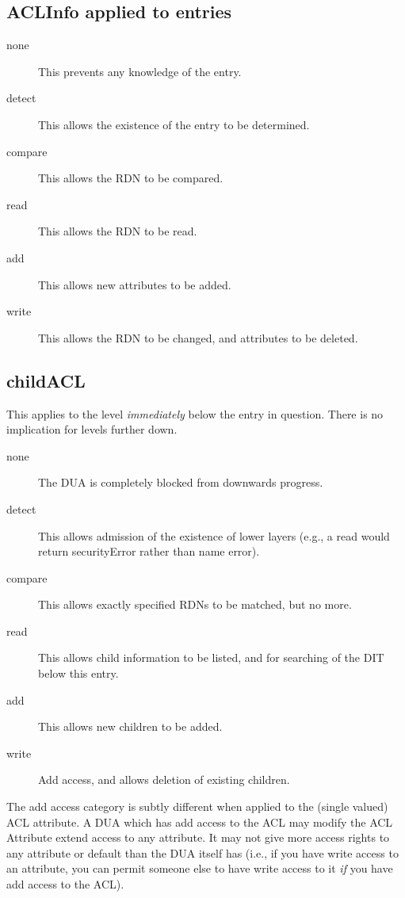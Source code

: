 \subsection {ACLInfo applied to entries}

\begin {description}
\item [none]

This prevents any knowledge of the entry.
\item [detect]

This allows the existence of the entry to be determined.
\item [compare]
This allows the RDN to be compared.
\item [read]
This allows the RDN to be read.
\item [add]
This allows new attributes to be added.
\item [write]
This allows the RDN to be changed, and attributes to be
deleted.
\end {description}

\subsection {childACL}

This applies to the level 
{\em immediately}
below the entry in question.
There is no implication for levels further down.

\begin {description}
\item [none]
The DUA is completely blocked from downwards progress.
\item [detect]

This allows admission of the existence of lower layers  (e.g., a read
would return securityError rather than name error).
\item [compare]
This allows exactly specified RDNs to be matched, but no more.
\item [read]
This allows child information to be listed, and for searching of the DIT
below this entry.
\item [add]
This allows new children to be added.
\item [write]
Add access, and allows deletion of existing children.
\end {description}

The add access category is subtly different when applied to the (single valued)
ACL attribute.
A DUA which has add access to the ACL may modify the ACL Attribute 
extend access to any
attribute.
It may not give more access rights to any attribute or default than the DUA
itself has (i.e., if you have write access to an attribute, you can
permit someone else to have write access to it {\em if} you have add access to
the ACL).

